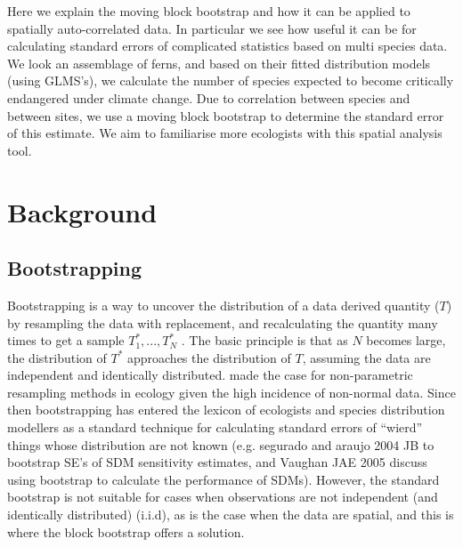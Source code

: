 \documentclass[a4paper,12pt]{article}
\begin{document}
Here we explain the moving block bootstrap and how it can be applied to spatially auto-correlated data. In particular we see how useful it can be for calculating standard errors of complicated statistics based on multi species data. We look an assemblage of ferns, and based on their fitted distribution models (using GLMS’s), we calculate the number of species expected to become critically endangered under climate change. Due to correlation between species and between sites, we use a moving block bootstrap to determine the standard error of this estimate. We aim to familiarise more ecologists with this spatial analysis tool.




\section{Background}
\subsection{Bootstrapping}

Bootstrapping is a way to uncover the distribution of a data derived quantity ($T$) by resampling the data with replacement, and recalculating the quantity many times to get a sample $T^*_1,...,T^*_N$ . The basic principle is that as $N$ becomes large, the distribution of $T^*$ approaches the distribution of $T$, assuming the data are independent and identically distributed.  \cite{potvin1993distribution} made the case for non-parametric resampling methods in ecology given the high incidence of non-normal data. Since then bootstrapping has entered the lexicon of ecologists and species distribution modellers as a standard technique for calculating standard errors of ``wierd'' things whose distribution are not known (e.g. segurado and araujo 2004 JB to bootstrap SE's of SDM sensitivity estimates, and Vaughan JAE 2005 discuss using bootstrap to calculate the performance of SDMs). However, the standard bootstrap is not suitable for cases when observations are not independent (and identically distributed) (i.i.d), as is the case when the data are spatial, and this is where the block bootstrap offers a solution. 


\end{document}
